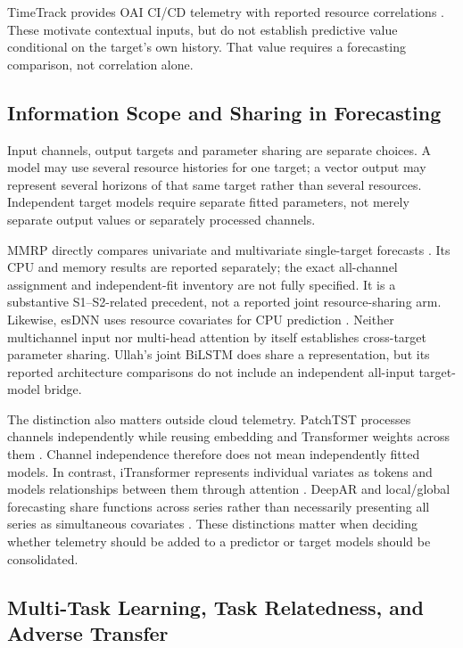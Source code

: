 \documentclass[a4paper,fleqn]{cas-dc}
\begin{document}
TimeTrack provides OAI CI/CD telemetry with reported resource correlations
\citep{Meliani2025TimeTrack}. These motivate contextual inputs, but do not
establish predictive value conditional on the target's own history.
That value requires a forecasting comparison, not correlation alone.

\subsection{Information Scope and Sharing in Forecasting}
\label{sec:rw-information-sharing}

Input channels, output targets and parameter sharing are separate choices.
A model may use several resource histories for one target; a vector output
may represent several horizons of that same target rather than several
resources. Independent target models require separate fitted parameters,
not merely separate output values or separately processed channels.

MMRP directly compares univariate and multivariate single-target forecasts
\citep{Tripathi2025MMRP}. Its CPU and memory results are reported separately;
the exact all-channel assignment and independent-fit inventory are not fully
specified. It is a substantive S1--S2-related precedent, not a reported joint
resource-sharing arm. Likewise, esDNN uses resource covariates for CPU
prediction \citep{Xu2022esDNN}. Neither multichannel input nor multi-head
attention by itself establishes cross-target parameter sharing. Ullah's joint
BiLSTM does share a representation, but its reported architecture comparisons
do not include an independent all-input target-model bridge.

The distinction also matters outside cloud telemetry. PatchTST processes
channels independently while reusing embedding and Transformer weights across
them \citep{Nie2023PatchTST}. Channel independence therefore does not mean
independently fitted models. In contrast, iTransformer represents individual
variates as tokens and models relationships between them through attention
\citep{Liu2024iTransformer}.
DeepAR and local/global forecasting share functions across series rather than
necessarily presenting all series as simultaneous covariates
\citep{Salinas2020DeepAR,MonteroManso2021GlobalForecasting}.
These distinctions matter when deciding whether telemetry should be added to
a predictor or target models should be consolidated.

\subsection{Multi-Task Learning, Task Relatedness, and Adverse Transfer}
\label{sec:rw-multitask}
\end{document}
